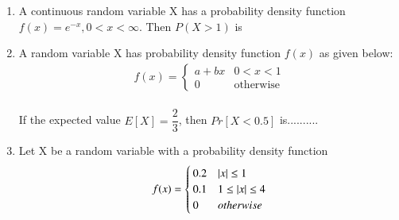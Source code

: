 \renewcommand{\theequation}{\theenumi}
\renewcommand{\thefigure}{\theenumi}
\renewcommand{\thetable}{\theenumi}
\begin{enumerate}[label=\thesection.\arabic*.,ref=\thesection.\theenumi]

\item A continuous random variable X has a probability density function $f(x) = e^{-x}, 0<x<\infty$. Then $P(X>1)$ is
\begin{enumerate}
\end{enumerate}
%
\solution


\item A random variable X has probability density function $f(x)$ as given below:\\
\begin{align}
f(x) =
\begin{cases}
a+bx
&  0<x<1
\\      
0
& \text{otherwise}
\end{cases}
\label{a}
\end{align}
\\
If the expected value $E[X]=\dfrac{2}{3}$, then $Pr[X<0.5]$ is..........
\\
\solution


\item Let X be a random variable with a probability density function
\begin{align}
f(x) = 
\begin{cases}
0.2 & \abs{x}\leq1
\\
0.1 & 1\leq\abs{x}\leq4
\\
0 & otherwise
\end{cases}
\label{pdf}
\end{align}


\end{enumerate}

